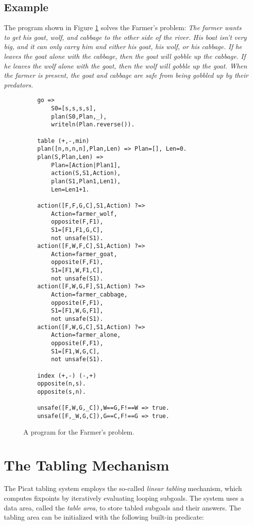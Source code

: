 \subsection*{Example}
The program shown in Figure \ref{fig:farmer} solves the Farmer's problem: {\em The farmer wants to get his goat, wolf, and cabbage to the other side of the river. His boat isn't very big, and it can only carry him and either his goat, his wolf, or his cabbage. If he leaves the goat alone with the cabbage, then the goat will gobble up the cabbage. If he leaves the wolf alone with the goat, then the wolf will gobble up the goat. When the farmer is present, the goat and cabbage are safe from being gobbled up by their predators.}


\begin{figure}
\begin{center}
\begin{verbatim}
    go =>
        S0=[s,s,s,s],
        plan(S0,Plan,_),
        writeln(Plan.reverse()).

    table (+,-,min)
    plan([n,n,n,n],Plan,Len) => Plan=[], Len=0.
    plan(S,Plan,Len) =>
        Plan=[Action|Plan1],
        action(S,S1,Action),
        plan(S1,Plan1,Len1),
        Len=Len1+1.
    
    action([F,F,G,C],S1,Action) ?=>
        Action=farmer_wolf,
        opposite(F,F1),
        S1=[F1,F1,G,C],
        not unsafe(S1).
    action([F,W,F,C],S1,Action) ?=>
        Action=farmer_goat,
        opposite(F,F1),
        S1=[F1,W,F1,C],
        not unsafe(S1).
    action([F,W,G,F],S1,Action) ?=>
        Action=farmer_cabbage,
        opposite(F,F1),
        S1=[F1,W,G,F1],
        not unsafe(S1).
    action([F,W,G,C],S1,Action) ?=>
        Action=farmer_alone,
        opposite(F,F1),
        S1=[F1,W,G,C],
        not unsafe(S1).

    index (+,-) (-,+)
    opposite(n,s).
    opposite(s,n).

    unsafe([F,W,G,_C]),W==G,F!==W => true.
    unsafe([F,_W,G,C]),G==C,F!==G => true.
\end{verbatim}
\end{center}
\caption{\label{fig:farmer}A program for the Farmer's problem.}
\end{figure}

\section{The Tabling Mechanism}
The Picat tabling system employs the so-called \emph{linear tabling} mechanism, which computes fixpoints by iteratively evaluating looping subgoals. The system uses a data area, called the \emph{table area}, to store tabled subgoals and their answers. The tabling area can be initialized with the following built-in predicate:

